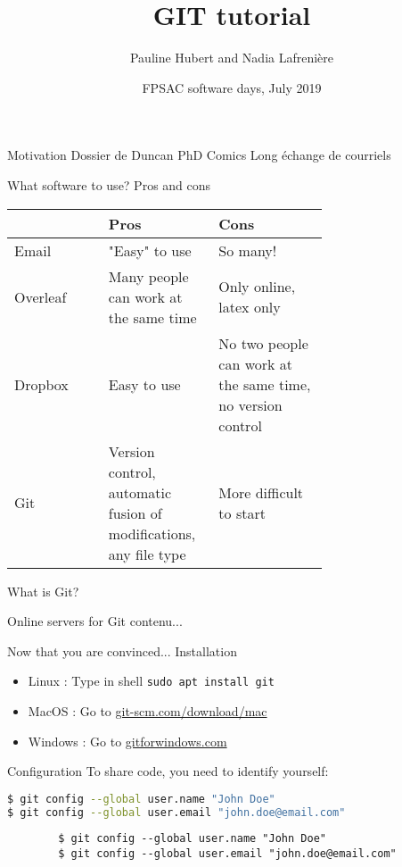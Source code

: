 \documentclass{beamer}
\title{GIT tutorial}
\author{Pauline Hubert and Nadia Lafrenière}
\date{FPSAC software days, July 2019}
\begin{document}
	\maketitle
	\begin{frame}{Motivation}
		Dossier de Duncan
		\pause
		PhD Comics
		\pause
		Long échange de courriels
	\end{frame}
	\begin{frame}{What software to use? Pros and cons}
		\begin{tabular}{lp{0.35\linewidth}p{0.35\linewidth}}
			& Pros & Cons\\
			\hline
			Email & "Easy" to use & So many!\\
			\hline
			Overleaf & Many people can work at the same time & Only online, latex only\\
			\hline
			Dropbox & Easy to use & No two people can work at the same time, no version control\\
			\hline
			Git & Version control, automatic fusion of modifications, any file type & More difficult to start\\
		\end{tabular}
	\end{frame}
	\begin{frame}{What is Git?}
		
	\end{frame}
	\begin{frame}{Online servers for Git}
		contenu...
	\end{frame}
	\begin{frame}{Now that you are convinced... Installation}
		\begin{itemize}
			\item Linux : Type in shell \texttt{sudo apt install git}
			\item MacOS : Go to \url{git-scm.com/download/mac}
			\item Windows : Go to \url{gitforwindows.com}
		\end{itemize}
	\end{frame}
	\begin{frame}[fragile]{Configuration}
	To share code, you need to identify yourself:
	\begin{lstlisting}[language=bash,fontadjust]
$ git config --global user.name "John Doe"
$ git config --global user.email "john.doe@email.com"
	\end{lstlisting}
	\begin{verbatim}
		$ git config --global user.name "John Doe"
		$ git config --global user.email "john.doe@email.com"
	\end{verbatim}
	\end{frame}
\end{document}
